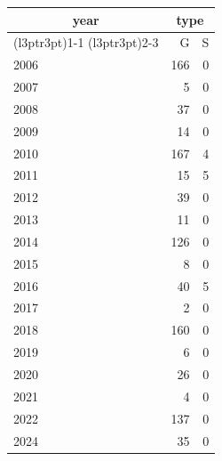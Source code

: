 \footnotesize\begin{tabular}[t]{lrr}
\toprule
\multicolumn{1}{c}{year} & \multicolumn{2}{c}{type} \\
\cmidrule(l{3pt}r{3pt}){1-1} \cmidrule(l{3pt}r{3pt}){2-3}
  & G & S\\
\midrule
2006 & 166 & 0\\
2007 & 5 & 0\\
2008 & 37 & 0\\
2009 & 14 & 0\\
2010 & 167 & 4\\
2011 & 15 & 5\\
2012 & 39 & 0\\
2013 & 11 & 0\\
2014 & 126 & 0\\
2015 & 8 & 0\\
2016 & 40 & 5\\
2017 & 2 & 0\\
2018 & 160 & 0\\
2019 & 6 & 0\\
2020 & 26 & 0\\
2021 & 4 & 0\\
2022 & 137 & 0\\
2024 & 35 & 0\\
\bottomrule
\end{tabular}
